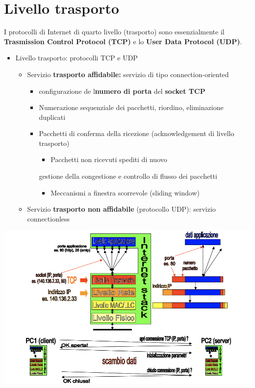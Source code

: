 \documentclass{article}
\begin{document}
\section{Livello trasporto}
I protocolli di Internet di quarto livello (trasporto) sono essenzialmente il \textbf{Trasmission Control Protocol (TCP)} e lo \textbf{User Data Protocol (UDP)}.
\begin{itemize}
    \item Livello trasporto: protocolli TCP e UDP
    \begin{itemize}
        \item Servizio \textbf{trasporto affidabile:} servizio di tipo connection-oriented
        \begin{itemize}
            \item configurazione de l\textbf{numero di porta} del \textbf{socket TCP}
            \item Numerazione sequenziale dei pacchetti, riordino, eliminazione duplicati
            \item Pacchetti di conferma della ricezione (acknowledgement di livello trasporto)
            \begin{itemize}
                \item Pacchetti non ricevuti spediti di nuovo
            \end{itemize}
            gestione della congestione e controllo di flusso dei pacchetti
            \begin{itemize}
                \item Meccanismi a finestra scorrevole (sliding window)
            \end{itemize}
        \end{itemize}
        \item Servizio \textbf{trasporto non affidabile} (protocollo UDP): servizio connectionless
    \end{itemize}
\end{itemize}
\begin{center}
    \includegraphics[width=6tcm]{img/trasporto.png}
\end{center}
\end{document}
